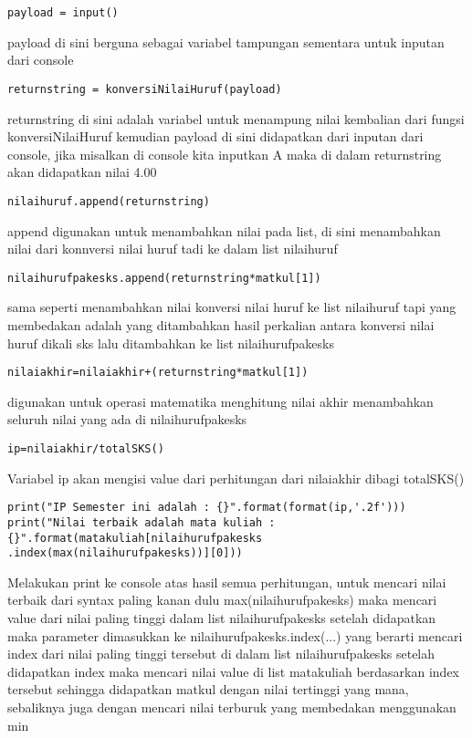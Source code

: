 \documentclass[a4paper]{article}
\begin{document}
\begin{lstlisting}
payload = input()
\end{lstlisting}
payload di sini berguna sebagai variabel tampungan sementara untuk inputan dari console
\begin{lstlisting}
returnstring = konversiNilaiHuruf(payload)
\end{lstlisting}
returnstring di sini adalah variabel untuk menampung nilai kembalian dari fungsi konversiNilaiHuruf kemudian payload di sini didapatkan dari inputan dari console, jika misalkan di console kita inputkan A maka di dalam returnstring akan didapatkan nilai 4.00
\begin{lstlisting}
nilaihuruf.append(returnstring)
\end{lstlisting}
append digunakan untuk menambahkan nilai pada list, di sini menambahkan nilai dari konnversi nilai huruf tadi ke dalam list nilaihuruf
\begin{lstlisting}
nilaihurufpakesks.append(returnstring*matkul[1])
\end{lstlisting}
sama seperti menambahkan nilai konversi nilai huruf ke list nilaihuruf tapi yang membedakan adalah yang ditambahkan hasil perkalian antara konversi nilai huruf dikali sks
lalu ditambahkan ke list nilaihurufpakesks
\begin{lstlisting}
nilaiakhir=nilaiakhir+(returnstring*matkul[1])
\end{lstlisting}
digunakan untuk operasi matematika menghitung nilai akhir menambahkan seluruh nilai yang ada di nilaihurufpakesks
\begin{lstlisting}
ip=nilaiakhir/totalSKS()
\end{lstlisting}
Variabel ip akan mengisi value dari perhitungan dari nilaiakhir dibagi totalSKS()

\begin{lstlisting}
print("IP Semester ini adalah : {}".format(format(ip,'.2f')))
print("Nilai terbaik adalah mata kuliah :
{}".format(matakuliah[nilaihurufpakesks
.index(max(nilaihurufpakesks))][0]))
\end{lstlisting}

Melakukan print ke console atas hasil semua perhitungan, untuk mencari nilai terbaik dari syntax paling kanan dulu max(nilaihurufpakesks) maka mencari value dari nilai paling tinggi dalam list nilaihurufpakesks setelah didapatkan maka parameter dimasukkan ke nilaihurufpakesks.index(...) yang berarti mencari index dari nilai paling tinggi tersebut di dalam list nilaihurufpakesks setelah didapatkan index maka mencari nilai value di list matakuliah berdasarkan index tersebut sehingga didapatkan matkul dengan nilai tertinggi yang mana, sebaliknya juga dengan mencari nilai terburuk yang membedakan menggunakan min
\end{document}
